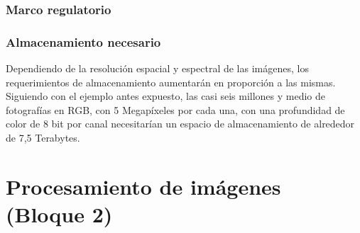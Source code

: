 \subsubsection{Marco regulatorio} %

\subsubsection{Almacenamiento necesario} %
Dependiendo de la resolución espacial y espectral de las imágenes, los requerimientos de almacenamiento aumentarán en proporción a las mismas. Siguiendo con el ejemplo antes expuesto, las casi seis millones y medio de fotografías en RGB, con 5 Megapíxeles por cada una, con una profundidad de color de 8 bit por canal necesitarían un espacio de almacenamiento de alrededor de 7,5 Terabytes.

\section{Procesamiento de imágenes (Bloque 2)} \label{Metodo bloque 2}
